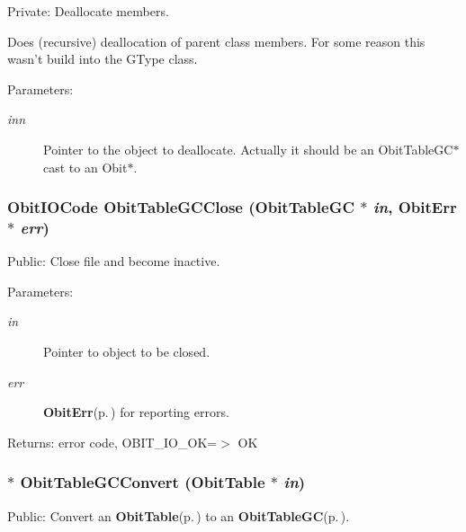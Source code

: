 Private: Deallocate members. 

Does (recursive) deallocation of parent class members. For some reason this wasn't build into the GType class. \begin{Desc}
\item[Parameters:]
\begin{description}
\item[{\em inn}]Pointer to the object to deallocate. Actually it should be an Obit\-Table\-GC$\ast$ cast to an Obit$\ast$. \end{description}
\end{Desc}
\subsubsection{\setlength{\rightskip}{0pt plus 5cm}Obit\-IOCode Obit\-Table\-GCClose ({\bf Obit\-Table\-GC} $\ast$ {\em in}, {\bf Obit\-Err} $\ast$ {\em err})}\label{ObitTableGC_8c_a25}


Public: Close file and become inactive. 

\begin{Desc}
\item[Parameters:]
\begin{description}
\item[{\em in}]Pointer to object to be closed. \item[{\em err}]{\bf Obit\-Err}{\rm (p.\,\pageref{structObitErr})} for reporting errors. \end{description}
\end{Desc}
\begin{Desc}
\item[Returns:]error code, OBIT\_\-IO\_\-OK=$>$ OK \end{Desc}
\subsubsection{$\ast$ Obit\-Table\-GCConvert ({\bf Obit\-Table} $\ast$ {\em in})}\label{ObitTableGC_8c_a19}


Public: Convert an {\bf Obit\-Table}{\rm (p.\,\pageref{structObitTable})} to an {\bf Obit\-Table\-GC}{\rm (p.\,\pageref{structObitTableGC})}. 

